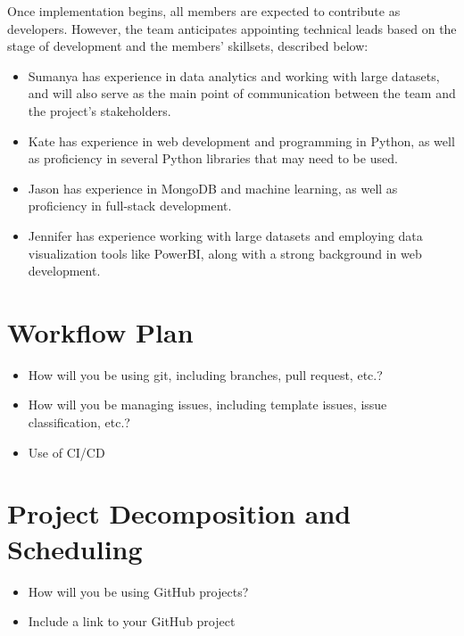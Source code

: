 \documentclass{article}
\begin{document}
\noindent Once implementation begins, all members are expected to contribute as developers.
However, the team anticipates appointing technical leads based on the stage of development and the members' skillsets, 
described below:

\begin{itemize}
  \item Sumanya has experience in data analytics and working with large datasets,
  and will also serve as the main point of communication between the team and the project's
  stakeholders.
  \item Kate has experience in web development and programming in Python, as well
  as proficiency in several Python libraries that may need to be used.
  \item Jason has experience in MongoDB and machine learning, as well as proficiency
  in full-stack development.
  \item Jennifer has experience working with large datasets and employing data
  visualization tools like PowerBI, along with a strong background in web development.
\end{itemize}

\section{Workflow Plan}

\begin{itemize}
	\item How will you be using git, including branches, pull request, etc.?
	\item How will you be managing issues, including template issues, issue
	classification, etc.?
  \item Use of CI/CD
\end{itemize}

\section{Project Decomposition and Scheduling}

\begin{itemize}
  \item How will you be using GitHub projects?
  \item Include a link to your GitHub project
\end{itemize}

\end{document}
